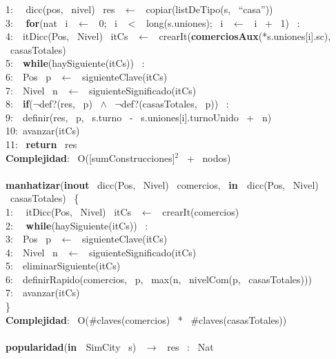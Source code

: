 \begin{Algoritmos}
{1: \  \ dicc(pos, \ nivel) \ res \ $\leftarrow$ \ copiar(listDeTipo(s, \ ``casa''))\\
3: \  \ \textbf{for}(nat \ i \ $\leftarrow$ \ 0; \ i \ $<$ \ long(s.uniones); \ i \ $\leftarrow$ \ i \ + \ 1) \ : \ \\
4:\indent  \  \ itDicc(Pos, \ Nivel) \ itCs \ $\leftarrow$ \ crearIt(\textbf{comerciosAux}(*s.uniones[i].sc), \ casasTotales)\\
5:\indent  \  \ \textbf{while}(haySiguiente(itCs)) \ :\\
6:\indent \indent  \  \ Pos \ p \ $\leftarrow$ \ siguienteClave(itCs)\\
7:\indent \indent  \  \ Nivel \ n \ $\leftarrow$ \ siguienteSignificado(itCs)\\
8:\indent \indent  \  \ \textbf{if}($\neg$def?(res, \ p) \ $\wedge$ \ $\neg$def?(casasTotales, \ p)) \ :\\
9:\indent \indent \indent  \  \ definir(res, \ p, \ s.turno \ - \ s.uniones[i].turnoUnido \ + \ n)\\
10:\indent \indent  \ avanzar(itCs)\\
11: \ \textbf{return} \ res\\
\textbf{Complejidad}: \ O([sumConstrucciones]$^2$ \ + \ nodos)\\
\\
\textbf{manhatizar}(\textbf{inout} \ dicc(Pos, \ Nivel) \ comercios, \ \textbf{in \ }dicc(Pos, \ Nivel) \ casasTotales) \ \{\\
1: \  \ itDicc(Pos, \ Nivel) \ itCs \ $\leftarrow$ \ crearIt(comercios)\\
2: \  \ \textbf{while}(haySiguiente(itCs)) \ :\\
3:\indent  \  \ Pos \ p \ $\leftarrow$ \ siguienteClave(itCs)\\
4:\indent  \  \ Nivel \ n \ $\leftarrow$ \ siguienteSignificado(itCs)\\
5:\indent  \  \ eliminarSiguiente(itCs)\\
6:\indent  \  \ definirRapido(comercios, \ p, \ max(n, \ nivelCom(p, \ casasTotales)))\\
7:\indent  \  \ avanzar(itCs)\\
\}\\
\textbf{Complejidad}: \ O($ \# $claves(comercios) \ * \ $ \# $claves(casasTotales))\\
\makebox[\linewidth]{\rule{\textwidth}{0.4pt}}
\\
\makebox[\linewidth]{\rule{\textwidth}{0.4pt}}
\textbf{popularidad}(\textbf{in \ }SimCity \ s) \ $\rightarrow $ \ res \ : \ Nat\\
}
\end{Algoritmos}
